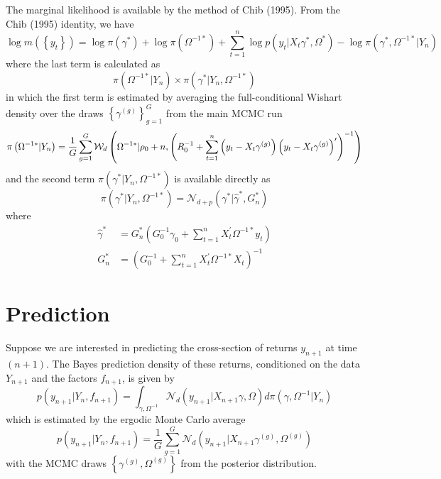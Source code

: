 \documentclass[12pt]{article}
\begin{document}
The marginal likelihood is available by the method of Chib (1995). From the
Chib (1995) identity, we have
\begin{equation*}
\log m\left( \left\{ y_{t}\right\} \right) =\log \pi \left( \gamma ^{\ast
}\right) +\log \pi \left( \Omega ^{-1\ast }\right) +\sum_{t=1}^{n}\log
p\left( y_{t}|X_{t}\gamma ^{\ast },\Omega ^{\ast }\right) -\log \pi \left(
\gamma ^{\ast },\Omega ^{-1\ast }|Y_{n}\right)
\end{equation*}%
where the last term is calculated as%
\begin{equation*}
\pi \left( \Omega ^{-1\ast }|Y_{n}\right) \times \pi \left( \gamma ^{\ast
}|Y_{n},\Omega ^{-1\ast }\right)
\end{equation*}%
in which the first term is estimated by averaging the full-conditional
Wishart density over the draws $\left\{ \gamma ^{(g)}\right\} _{g=1}^{G}$
from the main MCMC run
\begin{equation*}
\pi \left( \Omega ^{-1\ast }|Y_{n}\right) =\frac{1}{G}\sum_{g=1}^{G}\mathcal{%
W}_{d}\left( \Omega ^{-1\ast }|\rho _{0}+n,\left(
R_{0}^{-1}+\sum_{t=1}^{n}\left( y_{t}-X_{t}\gamma ^{(g)}\right) \left(
y_{t}-X_{t}\gamma ^{(g)}\right) ^{\prime }\right) ^{-1}\right)
\end{equation*}%
and the second term $\pi \left( \gamma ^{\ast }|Y_{n},\Omega ^{-1\ast
}\right) $ is available directly as%
\begin{equation*}
\pi (\gamma ^{\ast }|Y_{n},\Omega ^{-1\ast })=\mathcal{N}_{d+p}\left( \gamma
^{\ast }|\hat{\gamma}^{\ast },G_{n}^{\ast }\right)
\end{equation*}%
where%
\begin{align*}
\hat{\gamma}^{\ast }& =G_{n}^{\ast }\left( G_{0}^{-1}\gamma
_{0}+\sum_{t=1}^{n}X_{t}^{\prime }\Omega ^{-1\ast }y_{t}\right)  \\
G_{n}^{\ast }& =\left( G_{0}^{-1}+\sum_{t=1}^{n}X_{t}^{\prime }\Omega
^{-1\ast }X_{t}\right) ^{-1}
\end{align*}

\section{Prediction}

Suppose we are interested in predicting the cross-section of returns $y_{n+1}
$ at time $(n+1)$. The Bayes prediction density of these returns,
conditioned on the data $Y_{n+1}$ and the factors $f_{n+1}$, is given by%
\begin{equation*}
p(y_{n+1}|Y_{n},f_{n+1})=\int_{\gamma ,\Omega ^{-1}}\mathcal{N}_{d}\left(
y_{n+1}|X_{n+1}\gamma ,\Omega \right) d\pi \left( \gamma ,\Omega
^{-1}|Y_{n}\right)
\end{equation*}%
which is estimated by the ergodic Monte Carlo average
\begin{equation*}
p(y_{n+1}|Y_{n},f_{n+1})=\frac{1}{G}\sum_{g=1}^{G}\mathcal{N}_{d}\left(
y_{n+1}|X_{n+1}\gamma ^{(g)},\Omega ^{(g)}\right)
\end{equation*}%
with the MCMC draws $\left\{ \gamma ^{(g)},\Omega ^{(g)}\right\} $ from the
posterior distribution.
\end{document}
